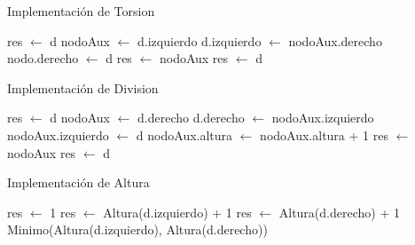 \begin{Algoritmos}
\begin{algorithm}
\caption{Implementaci\'on de Torsion}
\begin{algorithmic}[0]
		\State res $\gets$ d
	\Else
			\State nodoAux $\gets$ d.izquierdo
			\State d.izquierdo $\gets$ nodoAux.derecho
			\State nodo.derecho $\gets$ d
			\State res $\gets$ nodoAux
		\Else
			\State res $\gets$ d
		\EndIf
	\EndIf
\EndFunction
\end{algorithmic}
\end{algorithm}

\begin{algorithm}
\caption{Implementaci\'on de Division}
\begin{algorithmic}[0]
		\State res $\gets$ d
	\Else
			\State nodoAux $\gets$ d.derecho
			\State d.derecho $\gets$ nodoAux.izquierdo
			\State nodoAux.izquierdo $\gets$ d
			\State nodoAux.altura $\gets$ nodoAux.altura + 1
			\State res $\gets$ nodoAux
		\Else
			\State res $\gets$ d
		\EndIf
	\EndIf
\EndFunction
\end{algorithmic}
\end{algorithm}

\begin{algorithm}
\caption{Implementaci\'on de Altura}
\begin{algorithmic}[0]
		\State res $\gets$ 1
	\Else
			\State res $\gets$ Altura(d.izquierdo) + 1
		\Else
				\State res $\gets$ Altura(d.derecho) + 1
			\Else
				\State Minimo(Altura(d.izquierdo), Altura(d.derecho)) 
			\EndIf
		\EndIf
	\EndIf
\EndFunction
\end{algorithmic}
\end{algorithm}


\FloatBarrier
\end{Algoritmos}